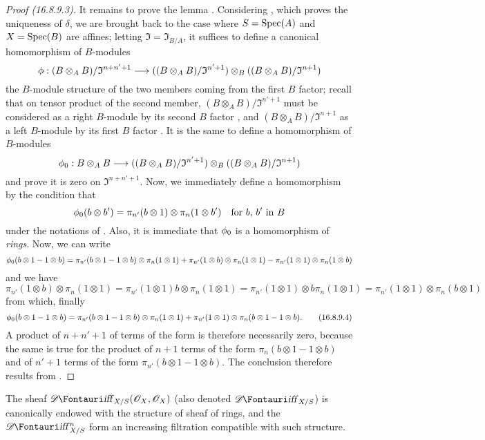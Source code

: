 \begin{proof}[Proof (16.8.9.3)]
It remains to prove the lemma .
Considering , which proves the uniqueness of $\delta$, we are brought back to the case where $S = \operatorname{Spec}(A)$ and $X = \operatorname{Spec}(B)$ are affines;
letting $\mathfrak{I} = \mathfrak{I}_{B/A}$, it suffices to define a canonical homomorphism of $B$-modules
\[
  \vphi: (B \otimes_A B)/\mathfrak{I}^{n+n'+1} \to ((B \otimes_A B)/\mathfrak{I}^{n' + 1}) \otimes_B ((B \otimes_A B)/\mathfrak{I}^{n + 1})
\]
the $B$-module structure of the two members coming from the first $B$ factor;
recall that on tensor product of the second member, $(B \otimes_A B)/\mathfrak{I}^{n' + 1}$ must be considered
as a right $B$-module by its second $B$ factor , and $(B \otimes_A B)/\mathfrak{I}^{n + 1}$ as a left $B$-module by its first $B$ factor .
It is the same to define a homomorphism of $B$-modules
\[
  \vphi_0: B \otimes_A B \to ((B \otimes_A B)/\mathfrak{I}^{n' + 1}) \otimes_B ((B \otimes_A B)/\mathfrak{I}^{n + 1})
\]
and prove it is zero on $\mathfrak{I}^{n+n'+1}$.
Now, we immediately define a homomorphism by the condition that
\[
  \phi_0(b \otimes b') = \pi_{n'}(b \otimes 1) \otimes \pi_n(1 \otimes b') \quad \text{for $b$, $b'$ in $B$}
\]
under the notations of .
Also, it is immediate that $\phi_0$ is a homomorphism of \emph{rings}.
Now, we can write 
\[
  \phi_0(b \otimes 1 - 1 \otimes b) = \pi_{n'}(b \otimes 1 - 1 \otimes b) \otimes \pi_n(1 \otimes 1) + \pi_{n'}(1 \otimes b) \otimes \pi_n(1 \otimes 1) - \pi_{n'}(1 \otimes 1) \otimes \pi_n(1 \otimes b)
\]
and we have 
\[
  \pi_{n'}(1 \otimes b) \otimes \pi_n(1 \otimes 1) = \pi_{n'}(1 \otimes 1) b \otimes \pi_n(1 \otimes 1) = \pi_{n'}(1 \otimes 1) \otimes b \pi_n(1 \otimes 1) = \pi_{n'}(1 \otimes 1) \otimes \pi_n(b \otimes 1)
\]
from which, finally
\[
  \label{IV.16.8.9.4}
  \phi_0(b \otimes 1 - 1 \otimes b) = \pi_{n'}(b \otimes 1 - 1 \otimes b) \otimes \pi_n(1 \otimes 1) + \pi_{n'}(1 \otimes 1) \otimes \pi_n(b \otimes 1 - 1 \otimes b). 
  \tag{16.8.9.4}
\]
A product of $n + n' + 1$ of terms of the form  is therefore necessarily zero, because the same is true for the product of $n+1$ terms of the form $\pi_n(b \otimes 1 - 1 \otimes b)$ and of $n' + 1$ terms of the form $\pi_{n'}(b \otimes 1 - 1 \otimes b)$.
The conclusion therefore results from .
\end{proof}

\begin{corollary}[16.8.10]
\label{IV.16.8.10}
The sheaf $\shDiff_{X/S}(\sh{O}_X, \sh{O}_X)$ (also denoted $\shDiff_{X/S}$) is canonically endowed with the structure of sheaf of rings, and the $\shDiff_{X/S}^n$ form an increasing filtration compatible with such structure.
\end{corollary}


